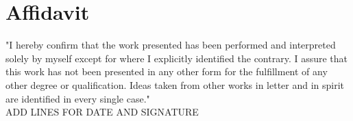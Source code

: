 \section*{Affidavit}
\vspace*{1.0cm}
"I  hereby confirm that the  work  presented  has  been  performed  and interpreted solely by myself except for where I explicitly identified the contrary. I assure that this work has not been presented in any other form for the fulfillment of any other degree or qualification. Ideas taken from other works in letter and in spirit are identified in every single case."\\
\newline
ADD LINES FOR DATE AND SIGNATURE
